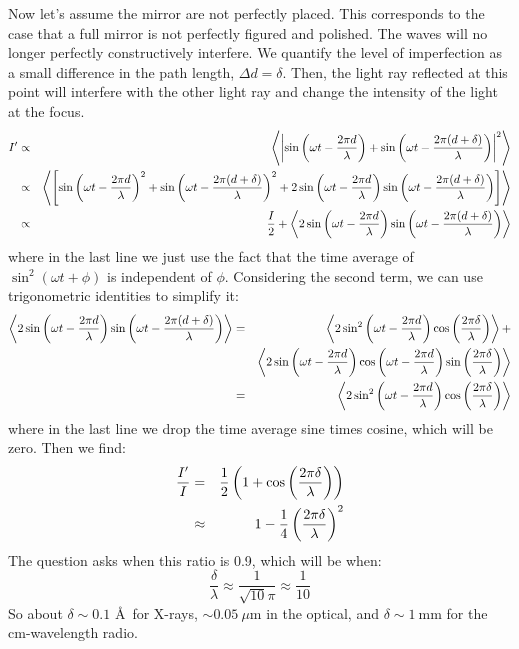 \begin{enumerate}
\begin{answer}
Now let's assume the mirror are not perfectly placed. This corresponds
to the case that a full mirror is not perfectly figured and
polished. The waves will no longer perfectly constructively interfere.
We quantify the level of imperfection as a small difference in the
path length, $\Delta d = \delta$. Then, the light ray reflected at
this point will interfere with the other light ray and change the
intensity of the light at the focus.
\begin{eqnarray}
I' &\propto& \left\langle\left|
\sin\left(\omega t - \frac{2\pi d}{\lambda}\right) +
\sin\left(\omega t - \frac{2\pi
(d+\delta)}{\lambda}\right)\right|^2\right\rangle \cr
&\propto& \left\langle\left[
\sin\left(\omega t - \frac{2\pi d}{\lambda}\right)^2 +
\sin\left(\omega t - \frac{2\pi (d+\delta)}{\lambda}\right)^2
+ 2 \sin\left(\omega t - \frac{2\pi d}{\lambda}\right)
\sin\left(\omega t - \frac{2\pi (d+\delta)}{\lambda}\right)
\right]\right\rangle \cr
&\propto& \frac{I}{2}
+ \left\langle 2 \sin\left(\omega t - \frac{2\pi d}{\lambda}\right)
\sin\left(\omega t - \frac{2\pi (d+\delta)}{\lambda}\right)
\right\rangle
\end{eqnarray}
where in the last line we just use the fact that the time average of
$\sin^2(\omega t + \phi)$ is independent of $\phi$. Considering the
second term, we can use trigonometric identities to simplify it:
\begin{eqnarray}
\left\langle 2 \sin\left(\omega t - \frac{2\pi d}{\lambda}\right)
\sin\left(\omega t - \frac{2\pi (d+\delta)}{\lambda}\right)
\right\rangle
&=& 
\left\langle 2 \sin^2\left(\omega t - \frac{2\pi d}{\lambda}\right)
\cos\left(\frac{2\pi \delta}{\lambda}\right)
\right\rangle + \cr
& &
\left\langle 2
\sin\left(\omega t - \frac{2\pi d}{\lambda}\right)
\cos\left(\omega t - \frac{2\pi d}{\lambda}\right)
\sin\left(\frac{2\pi \delta}{\lambda}\right)
\right\rangle \cr
&=& 
\left\langle 2 \sin^2\left(\omega t - \frac{2\pi d}{\lambda}\right)
\cos\left(\frac{2\pi \delta}{\lambda}\right)
\right\rangle
\end{eqnarray}
where in the last line we drop the time average sine times cosine,
which will be zero. Then we find:
\begin{eqnarray}
\frac{I'}{I} &=& \frac{1}{2} \left(1 + 
\cos\left(\frac{2\pi \delta}{\lambda}\right) \right) \cr
&\approx& 1 - \frac{1}{4}\left(\frac{2\pi\delta}{\lambda}\right)^2
\end{eqnarray}
The question asks when this ratio is 0.9, which will be when:
\begin{equation}
\frac{\delta}{\lambda} \approx \frac{1}{\sqrt{10} \pi} \approx \frac{1}{10}
\end{equation}
So about $\delta \sim 0.1$ \AA\ for X-rays, $\sim 0.05~\mu$m  in the
optical, and $\delta \sim 1~$mm for 
the cm-wavelength radio.
 \end{answer}
\end{enumerate} 

